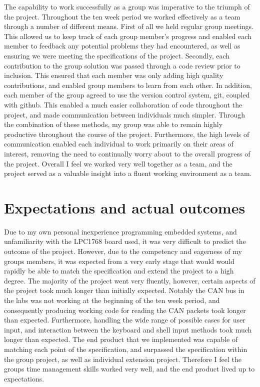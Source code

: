 The capability to work successfully as a group was imperative to the triumph of
the project. 
Throughout the ten week period we worked effectively as a team through a number 
of different means. 
First of all we held regular group meetings. This allowed us to keep track of 
each group member's progress and enabled each member to feedback any potential 
problems they had encountered, as well as ensuring we were meeting the 
specifications of the project. 
Secondly, each contribution to the group solution was passed through a code 
review prior to inclusion. 
This ensured that each member was only adding high 
quality contributions, and enabled group members to learn from each other.
In addition, each member of the group agreed to use the version control system, 
git, coupled with github. This enabled a much easier collaboration of code 
throughout the project, and made communication between individuals much simpler. 
Through the combination of these methods, my group was able to remain highly 
productive throughout the course of the project.
Furthermore, the high levels of communication enabled each individual to work 
primarily on their areas of interest, removing the need to continually worry 
about to the overall progress of the project. 
Overall I feel we worked very well together as a team, and the project served 
as a valuable insight into a fluent working environment as a team. 

\section{Expectations and actual outcomes}

Due to my own personal inexperience programming embedded systems, and 
unfamiliarity with the LPC1768 board used, it was very difficult to predict the 
outcome of the project. 
However, due to the competency and eagerness of my groups members, it was 
expected from a very early stage that would would rapidly be able to match the 
specification and extend the project to a high degree. 
The majority of the project went very fluently, however, certain aspects of the 
project took much longer than initially expected. 
Notably the CAN bus in the labs was not working at the beginning of the ten week
period, and consequently producing working code for reading the CAN packets took 
longer than expected. 
Furthermore, handling the wide range of possible cases for 
user input, and interaction between the keyboard and shell input methods took much 
longer than expected. 
The end product that we implemented was capable of matching each point of the 
specification, and surpassed the specification within the group project, 
as well as individual extension project. 
Therefore I feel the groups time management skills worked very well, and the end 
product lived up to expectations.

